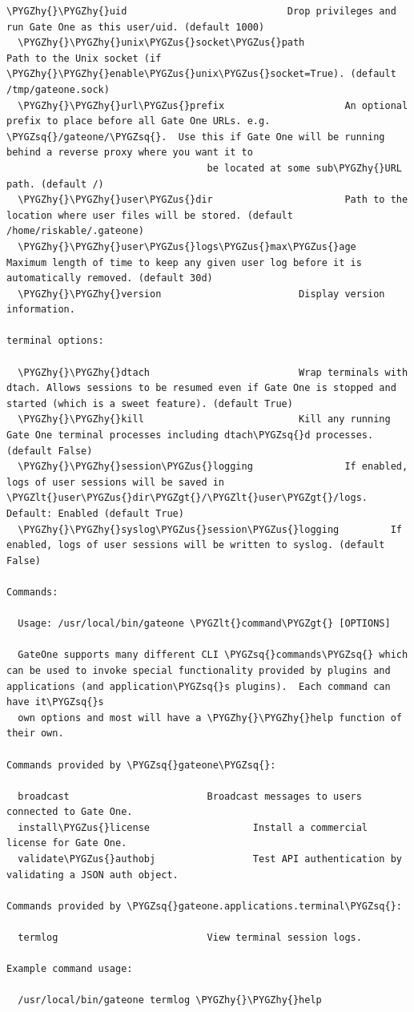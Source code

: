 \documentclass[letterpaper,10pt,openany]{sphinxmanual}
\def\PYGZus{\char`\_}
\def\PYGZlt{\char`\<}
\def\PYGZgt{\char`\>}
\def\PYGZhy{\char`\-}
\def\PYGZsq{\char`\'}
\begin{document}
\begin{Verbatim}[commandchars=\\\{\}]
  \PYGZhy{}\PYGZhy{}uid                            Drop privileges and run Gate One as this user/uid. (default 1000)
  \PYGZhy{}\PYGZhy{}unix\PYGZus{}socket\PYGZus{}path               Path to the Unix socket (if \PYGZhy{}\PYGZhy{}enable\PYGZus{}unix\PYGZus{}socket=True). (default /tmp/gateone.sock)
  \PYGZhy{}\PYGZhy{}url\PYGZus{}prefix                     An optional prefix to place before all Gate One URLs. e.g. \PYGZsq{}/gateone/\PYGZsq{}.  Use this if Gate One will be running behind a reverse proxy where you want it to
                                   be located at some sub\PYGZhy{}URL path. (default /)
  \PYGZhy{}\PYGZhy{}user\PYGZus{}dir                       Path to the location where user files will be stored. (default /home/riskable/.gateone)
  \PYGZhy{}\PYGZhy{}user\PYGZus{}logs\PYGZus{}max\PYGZus{}age              Maximum length of time to keep any given user log before it is automatically removed. (default 30d)
  \PYGZhy{}\PYGZhy{}version                        Display version information.

terminal options:

  \PYGZhy{}\PYGZhy{}dtach                          Wrap terminals with dtach. Allows sessions to be resumed even if Gate One is stopped and started (which is a sweet feature). (default True)
  \PYGZhy{}\PYGZhy{}kill                           Kill any running Gate One terminal processes including dtach\PYGZsq{}d processes. (default False)
  \PYGZhy{}\PYGZhy{}session\PYGZus{}logging                If enabled, logs of user sessions will be saved in \PYGZlt{}user\PYGZus{}dir\PYGZgt{}/\PYGZlt{}user\PYGZgt{}/logs.  Default: Enabled (default True)
  \PYGZhy{}\PYGZhy{}syslog\PYGZus{}session\PYGZus{}logging         If enabled, logs of user sessions will be written to syslog. (default False)

Commands:

  Usage: /usr/local/bin/gateone \PYGZlt{}command\PYGZgt{} [OPTIONS]

  GateOne supports many different CLI \PYGZsq{}commands\PYGZsq{} which can be used to invoke special functionality provided by plugins and applications (and application\PYGZsq{}s plugins).  Each command can have it\PYGZsq{}s
  own options and most will have a \PYGZhy{}\PYGZhy{}help function of their own.

Commands provided by \PYGZsq{}gateone\PYGZsq{}:

  broadcast                        Broadcast messages to users connected to Gate One.
  install\PYGZus{}license                  Install a commercial license for Gate One.
  validate\PYGZus{}authobj                 Test API authentication by validating a JSON auth object.

Commands provided by \PYGZsq{}gateone.applications.terminal\PYGZsq{}:

  termlog                          View terminal session logs.

Example command usage:

  /usr/local/bin/gateone termlog \PYGZhy{}\PYGZhy{}help
\end{Verbatim}
\end{document}
